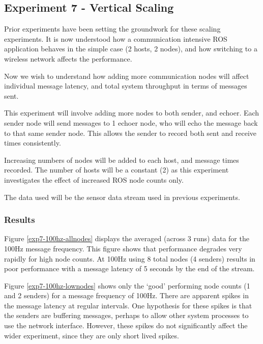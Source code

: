 \documentclass[../dissertation.tex]{subfiles}
\begin{document}
\subsection{Experiment 7 - Vertical Scaling}
\label{experiment7-vertical-scaling}

Prior experiments have been setting the groundwork for these scaling experiments. It is now understood how a communication intensive ROS application behaves in the simple case (2 hosts, 2 nodes), and how switching to a wireless network affects the performance.

Now we wish to understand how adding more communication nodes will affect individual message latency, and total system throughput in terms of messages sent.

This experiment will involve adding more nodes to both sender, and echoer. Each sender node will send messages to 1 echoer node, who will echo the message back to that same sender node. This allows the sender to record both sent and receive times consistently.

Increasing numbers of nodes will be added to each host, and message times recorded. The number of hosts will be a constant (2) as this experiment investigates the effect of increased ROS node counts only.

The data used will be the sensor data stream used in previous experiments.

\subsubsection{Results}

Figure \ref{exp7-100hz-allnodes} displays the averaged (across 3 runs) data for the 100Hz message frequency. This figure shows that performance degrades very rapidly for high node counts. At 100Hz using 8 total nodes (4 senders) results in poor performance with a message latency of 5 seconds by the end of the stream.

Figure \ref{exp7-100hz-lownodes} shows only the `good' performing node counts (1 and 2 senders) for a message frequency of 100Hz. There are apparent spikes in the message latency at regular intervals. One hypothesis for these spikes is that the senders are buffering messages, perhaps to allow other system processes to use the network interface. However, these spikes do not significantly affect the wider experiment, since they are only short lived spikes.
\end{document}

